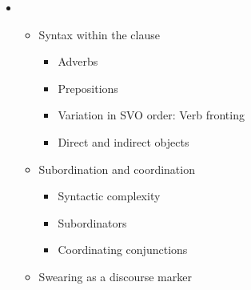 \setcounter{itemize}{6}
\begin{itemize}
\item \begin{itemize}
\item \begin{styleListParagraph}
Syntax within the clause 
\end{styleListParagraph}

\begin{itemize}
\item \begin{styleListParagraph}
Adverbs
\end{styleListParagraph}
\item \begin{styleListParagraph}
Prepositions 
\end{styleListParagraph}
\item \begin{styleListParagraph}
Variation in SVO order: Verb fronting 
\end{styleListParagraph}
\item \begin{styleListParagraph}
Direct and indirect objects 
\end{styleListParagraph}
\end{itemize}
\item \begin{styleListParagraph}
Subordination and coordination 
\end{styleListParagraph}

\begin{itemize}
\item \begin{styleListParagraph}
Syntactic complexity
\end{styleListParagraph}
\item \begin{styleListParagraph}
Subordinators
\end{styleListParagraph}
\item \begin{styleListParagraph}
Coordinating conjunctions 
\end{styleListParagraph}
\end{itemize}
\item \begin{styleListParagraph}
Swearing as a discourse marker 
\end{styleListParagraph}


\end{itemize}
\end{itemize}

